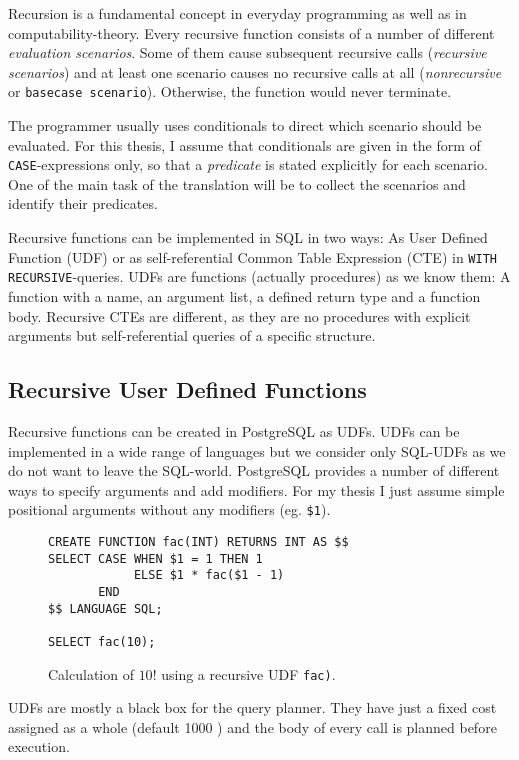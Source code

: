 Recursion is a fundamental concept in everyday programming as well as in computability-theory. Every recursive function consists of a number of different \textit{evaluation scenarios}. Some of them cause subsequent recursive calls (\textit{recursive scenarios}) and at least one scenario causes no recursive calls at all (\textit{nonrecursive} or \texttt{basecase scenario}). Otherwise, the function would never terminate.

The programmer usually uses conditionals to direct which scenario should be evaluated. For this thesis, I assume that conditionals are given in the form of \texttt{CASE}-expressions only, so that a \textit{predicate} is stated explicitly for each scenario. One of the main task of the translation will be to collect the scenarios and identify their predicates.

Recursive functions can be implemented in SQL in two ways: As User Defined Function (UDF) or as self-referential Common Table Expression (CTE) in \texttt{WITH RECURSIVE}-queries. UDFs are functions (actually procedures) as we know them: A function with a name, an argument list, a defined return type and a function body. Recursive CTEs are different, as they are no procedures with explicit arguments but self-referential queries of a specific structure.

\subsection{Recursive User Defined Functions}
Recursive functions can be created in PostgreSQL as UDFs. UDFs can be implemented in a wide range of languages but we consider only SQL-UDFs as we do not want to leave the SQL-world. PostgreSQL provides a number of different ways to specify arguments and add modifiers. For my thesis I just assume simple positional arguments without any modifiers (eg. \texttt{\$1}).

\begin{figure}[h!]
    \centering
    \begin{verbatim}
CREATE FUNCTION fac(INT) RETURNS INT AS $$
SELECT CASE WHEN $1 = 1 THEN 1
            ELSE $1 * fac($1 - 1)
       END
$$ LANGUAGE SQL;

SELECT fac(10);
    \end{verbatim}
    \caption{Calculation of $10!$ using a recursive UDF \texttt{fac)}.}
    \label{fig:my_label}
\end{figure}

UDFs are mostly a black box for the query planner. They have just a fixed cost assigned as a whole (default 1000 \cite[p. 1435]{psql}) and the body of every call is planned before execution.

